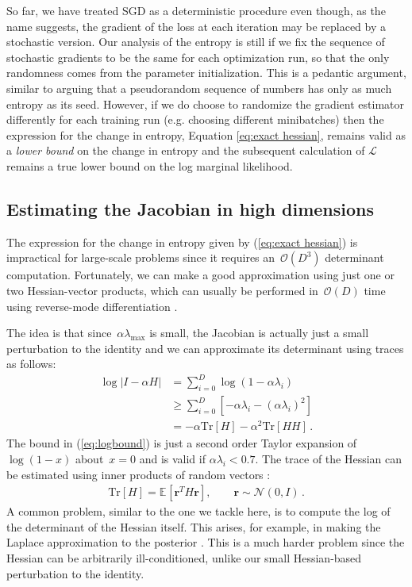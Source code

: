 \documentclass[]{article}
\newcommand{\vr}{\mathbf{r}}
\newcommand{\expectargs}[2]{\mathbb{E}_{#1} \left[ {#2} \right]}
\newcommand{\varL}{\mathcal{L}}
\newcommand{\N}[2]{\mathcal{N}\!\left(#1,#2\right)}
\newcommand{\stepsize}{\alpha}
\newcommand{\bigo}[1]{\mathcal{O}\left(#1\right)}
\newcommand{\trace}[1]{\text{Tr}\left[#1\right]}
\begin{document}
So far, we have treated SGD as a deterministic procedure even though, as the name suggests,
the gradient of the loss at each iteration may be replaced by a stochastic version. Our analysis of the entropy is still if we fix the sequence of stochastic gradients to be the same for each optimization run, so that the only randomness comes from the parameter initialization.
This is a pedantic argument, similar to arguing that a pseudorandom sequence of numbers has only as much entropy as its seed.
However, if we do choose to randomize the gradient estimator differently for each training run
(e.g. choosing different minibatches) then the expression for the change in entropy, Equation \ref{eq:exact hessian}, remains valid as a \emph{lower bound} on the change in entropy and the 
subsequent calculation of $\varL$ remains a true lower bound on the log marginal likelihood.


\subsection{Estimating the Jacobian in high dimensions}
The expression for the change in entropy given by (\ref{eq:exact hessian}) is impractical for large-scale problems since it requires an~$\bigo{D^3}$ determinant computation.
Fortunately, we can make a good approximation using just one or two Hessian-vector products, which can usually be performed in~$\bigo{D}$ time using reverse-mode differentiation \citep{pearlmutter1994fast}.

The idea is that since~$\stepsize\lambda_{\text{max}}$ is small, the Jacobian is actually just a small perturbation to the identity and we can approximate its determinant using traces as follows:
%
\begin{align}
\log \left| I - \stepsize H \right|
& =    \sum_{i=0}^D \log\left(1 - \stepsize\lambda_i\right) \nonumber \\
& \geq \sum_{i=0}^D \left[- \stepsize\lambda_i 
                        - (\stepsize\lambda_i)^2 \right] \label{eq:logbound} \\
& = - \stepsize \trace{H} - \stepsize^2 \trace{HH}\,.
\end{align}
%
The bound in (\ref{eq:logbound}) is just a second order Taylor expansion of~$\log(1 - x)$ about~${x = 0}$ and is valid if ${\stepsize\lambda_i < 0.7}$. 
The trace of the Hessian can be estimated using inner products of random vectors
\citep{bai1996some}:
%
\begin{align}
\trace{H} = \expectargs{}{\vr^TH\vr}, \qquad \vr \sim \N{0}{I}\,.
\label{eq:approx-log-det}
\end{align}
%
A common problem, similar to the one we tackle here, is to compute the log of the determinant of the Hessian itself.
This arises, for example, in making the Laplace approximation to the posterior \citep{mackay1992practical}.
This is a much harder problem since the Hessian can be arbitrarily ill-conditioned, unlike our small Hessian-based perturbation to the identity.
\end{document}
